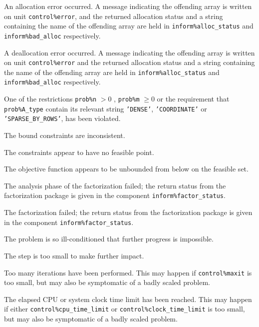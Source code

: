 \documentclass{galahad}
\begin{document}
\begin{description}

 An allocation error occurred. A message indicating
the offending
array is written on unit {\tt control\%error}, and the returned allocation
status and a string containing the name of the offending array
are held in {\tt inform\%alloc\_\-status}
and {\tt inform\%bad\_alloc} respectively.

 A deallocation error occurred.
A message indicating the offending
array is written on unit {\tt control\%error} and the returned allocation
status and a string containing the name of the offending array
are held in {\tt inform\%alloc\_\-status}
and {\tt inform\%bad\_alloc} respectively.

 One of the restrictions
 {\tt prob\%n} $> 0$ ,  {\tt prob\%m} $\geq 0$ or
    the requirement that {\tt prob\%A\_type} contain its relevant string
    {\tt 'DENSE'}, {\tt 'COORDINATE'} or {\tt 'SPARSE\_BY\_ROWS'},
    has been violated.

 The bound constraints are inconsistent.

 The constraints appear to have no feasible point.

 The objective function appears to be unbounded
  from below on the feasible set.

 The analysis phase of the factorization failed;
  the return status from the factorization
    package is given in the component {\tt inform\%fac\-t\-or\_status}.

 The factorization failed; the return status
  from the factorization
    package is given in the component {\tt inform\%fac\-t\-or\_status}.

 The problem is so ill-conditioned that
 further progress is impossible.

 The step is too small to make further impact.

 Too many iterations have been performed.
   This may happen if
    {\tt control\%maxit} is too small, but may also be symptomatic of
    a badly scaled problem.

 The elapsed CPU or system clock time limit has been
    reached. This may happen if either {\tt control\%cpu\_time\_limit} or
    {\tt control\%clock\_time\_limit} is too small, but may also be symptomatic
    of a badly scaled problem.

\end{description}
\end{document}
